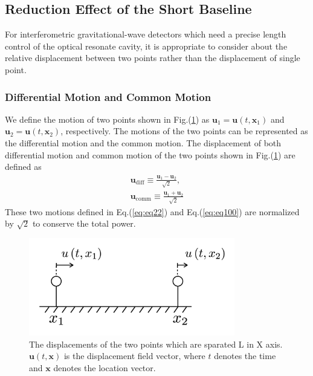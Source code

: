 \subsection{Reduction Effect of the Short Baseline} \label{sec:313}
For interferometric gravitational-wave detectors which need a precise length control of the optical resonate cavity, it is appropriate to consider about the relative displacement between two points rather than the displacement of single point.



\subsubsection{Differential Motion and Common Motion}
We define the motion of two points shown in Fig.(\ref{img:img310}) as $\bm{u}_1=\bm{u}(t,\bm{x}_1)$ and $\bm{u}_2=\bm{u}(t,\bm{x}_2)$, respectively. The motions of the two points can be represented as the differential motion and the common motion. The displacement of both differential motion and common motion of the two points shown in Fig.(\ref{img:img310}) are defined as
\begin{eqnarray}
  \bm{u}_{\mathrm{diff}} \equiv \frac{\bm{u}_{1}-\bm{u}_{2}}{\sqrt{2}}, \, \\ \label{eq:eq22}
  \bm{u}_{\mathrm{comm}}  \equiv \frac{\bm{u}_{1}+\bm{u}_{2}}{\sqrt{2}} \label{eq:eq100}
\end{eqnarray}
These two motions defined in Eq.(\ref{eq:eq22}) and Eq.(\ref{eq:eq100}) are normalized by $\sqrt{2}$ to conserve the total power.
\begin{figure}[h]
  \begin{center}
    \includegraphics[width=9.0cm]{./img_chap3/img315.png}
    \caption{The displacements of the two points which are sparated L in X axis. $\bm{u}(t,\bm{x})$ is the displacement field vector, where $t$ denotes the time and $\bm{x}$ denotes the location vector.}\label{img:img310}    
  \end{center}
\end{figure}



